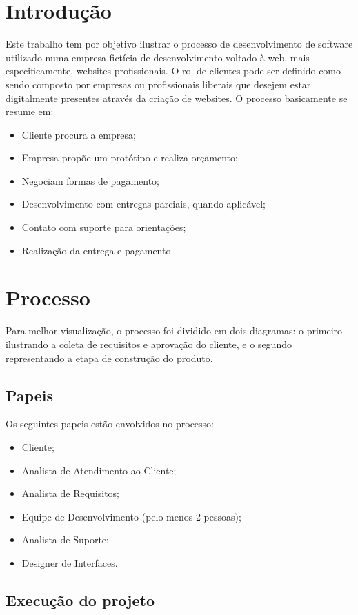 \documentclass[	DIV=calc,%
							paper=a4,%
							fontsize=12pt,%
							onecolumn]{scrartcl}	 					%
\begin{document}
\section{Introdução}
Este trabalho tem por objetivo ilustrar o processo de desenvolvimento de software utilizado numa empresa fictícia de desenvolvimento voltado à web, mais especificamente, websites profissionais. O rol de clientes pode ser definido como sendo composto por empresas ou profissionais liberais que desejem estar digitalmente presentes através da criação de websites. 
O processo basicamente se resume em:
\begin{itemize}
	\item Cliente procura a empresa;
	\item Empresa propõe um protótipo e realiza orçamento;
	\item Negociam formas de pagamento;
	\item Desenvolvimento com entregas parciais, quando aplicável;
	\item Contato com suporte para orientações;
	\item Realização da entrega e pagamento.
\end{itemize}


\section{Processo}
Para melhor visualização, o processo foi dividido em dois diagramas: o primeiro ilustrando a coleta de requisitos e aprovação do cliente, e o segundo representando a etapa de construção do produto.

\subsection{Papeis}
Os seguintes papeis estão envolvidos no processo:
\begin{itemize}
	\item Cliente;
	\item Analista de Atendimento ao Cliente;
	\item Analista de Requisitos;
	\item Equipe de Desenvolvimento (pelo menos 2 pessoas);
	\item Analista de Suporte;
	\item Designer de Interfaces.
\end{itemize}


\subsection{Execução do projeto}
\end{document}
